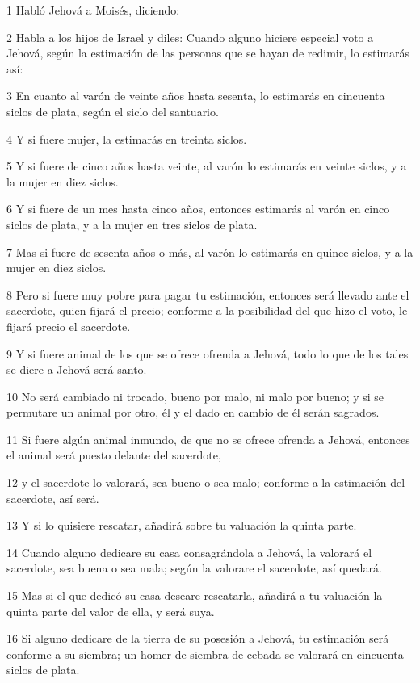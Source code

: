 \par 1 Habló Jehová a Moisés, diciendo:
\par 2 Habla a los hijos de Israel y diles: Cuando alguno hiciere especial voto a Jehová, según la estimación de las personas que se hayan de redimir, lo estimarás así:
\par 3 En cuanto al varón de veinte años hasta sesenta, lo estimarás en cincuenta siclos de plata,  según el siclo del santuario.
\par 4 Y si fuere mujer, la estimarás en treinta siclos.
\par 5 Y si fuere de cinco años hasta veinte, al varón lo estimarás en veinte siclos,  y a la mujer en diez siclos.
\par 6 Y si fuere de un mes hasta cinco años, entonces estimarás al varón en cinco siclos de plata,  y a la mujer en tres siclos de plata.
\par 7 Mas si fuere de sesenta años o más, al varón lo estimarás en quince siclos,  y a la mujer en diez siclos.
\par 8 Pero si fuere muy pobre para pagar tu estimación, entonces será llevado ante el sacerdote, quien fijará el precio; conforme a la posibilidad del que hizo el voto, le fijará precio el sacerdote.
\par 9 Y si fuere animal de los que se ofrece ofrenda a Jehová, todo lo que de los tales se diere a Jehová será santo.
\par 10 No será cambiado ni trocado, bueno por malo, ni malo por bueno; y si se permutare un animal por otro, él y el dado en cambio de él serán sagrados.
\par 11 Si fuere algún animal inmundo, de que no se ofrece ofrenda a Jehová, entonces el animal será puesto delante del sacerdote,
\par 12 y el sacerdote lo valorará, sea bueno o sea malo; conforme a la estimación del sacerdote, así será.
\par 13 Y si lo quisiere rescatar, añadirá sobre tu valuación la quinta parte.
\par 14 Cuando alguno dedicare su casa consagrándola a Jehová, la valorará el sacerdote, sea buena o sea mala; según la valorare el sacerdote, así quedará.
\par 15 Mas si el que dedicó su casa deseare rescatarla, añadirá a tu valuación la quinta parte del valor de ella, y será suya.
\par 16 Si alguno dedicare de la tierra de su posesión a Jehová, tu estimación será conforme a su siembra; un homer   de siembra de cebada se valorará en cincuenta siclos de plata.
